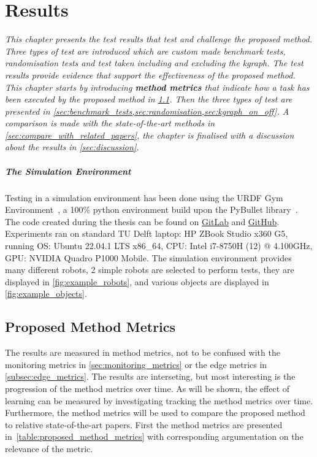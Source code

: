 \chapter{Results}%
\label{chap:results}
\textit{This chapter presents the test results that test and challenge the proposed method. Three types of test are introduced which are custom made benchmark tests, randomisation tests and test taken including and excluding the \ac{kgraph}. The test results provide evidence that support the effectiveness of the proposed method. This chapter starts by introducing \textbf{method metrics} that indicate how a task has been executed by the proposed method in \cref{sec:proposed_method_metrics}. Then the three types of test are presented in \cref{sec:benchmark_tests,sec:randomisation,sec:kgraph_on_off}. A comparison is made with the state-of-the-art methods in \cref{sec:compare_with_related_papers}, the chapter is finalised with a discussion about the results in \cref{sec:discussion}.\bs}

\paragraph{The Simulation Environment}
Testing in a simulation environment has been done using the URDF Gym Environment~\cite{spahn_urdfenvironment_2022}, a 100\% python environment build upon the PyBullet library~\cite{coumans_pybullet_2016}. The code created during the thesis can be found on \href{https://gitlab.tudelft.nl/airlab-delft/msc_projects/msc_gijs_groote}{GitLab} and \href{https://github.com/GijsGroote/semantic-thinking-robot}{GitHub}. Experiments ran on standard TU Delft laptop: HP ZBook Studio x360 G5, running OS: Ubuntu 22.04.1 LTS x86\_64, CPU: Intel i7-8750H (12) @ 4.100GHz, GPU: NVIDIA Quadro P1000 Mobile.\bs
The simulation environment provides many different robots, 2 simple robots are selected to perform tests, they are displayed in \cref{fig:example_robots}, and various objects are displayed in \cref{fig:example_objects}.



\section{Proposed Method Metrics}%
\label{sec:proposed_method_metrics}
The results are measured in method metrics, not to be confused with the monitoring metrics in \cref{sec:monitoring_metrics} or the edge metrics in \cref{subsec:edge_metrics}. The results are interseting, but most interesting is the progression of the method metrics over time. As will be shown, the effect of learning can be measured by investigating tracking the method metrics over time. Furthermore, the method metrics will be used to compare the proposed method to relative state-of-the-art papers. First the method metrics are presented in~\cref{table:proposed_method_metrics} with corresponding argumentation on the relevance of the metric.\bs

